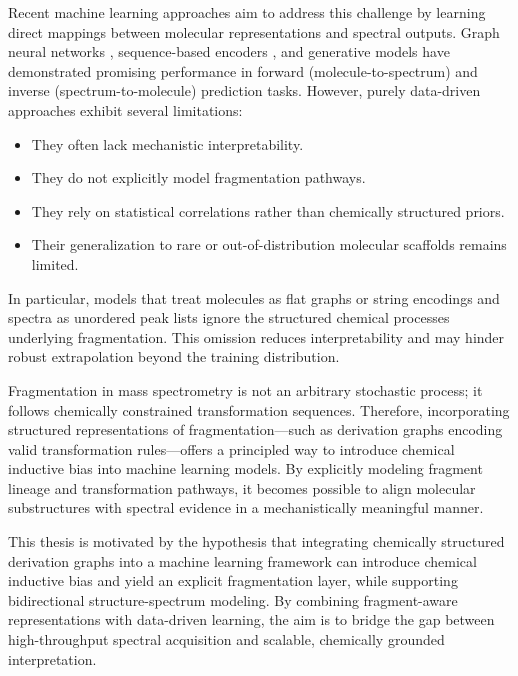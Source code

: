 Recent machine learning approaches aim to address this challenge by learning direct mappings between molecular representations and spectral outputs. 
Graph neural networks \cite{Young2024}, sequence-based encoders \cite[p.~1573]{Schwaller2019}, and generative models have demonstrated promising performance in forward (molecule-to-spectrum) and inverse (spectrum-to-molecule) prediction tasks. 
However, purely data-driven approaches exhibit several limitations:
\begin{itemize}
    \item They often lack mechanistic interpretability. \cite[p.~3\&~6]{Nowatzky2025}
    \item They do not explicitly model fragmentation pathways. \cite[p.~3]{Nowatzky2025}
    \item They rely on statistical correlations rather than chemically structured priors. \cite[p.~966]{Goldman2023}
    \item Their generalization to rare or out-of-distribution molecular scaffolds remains limited. \cite[p.~12]{Russo2024}
\end{itemize}

In particular, models that treat molecules as flat graphs or string encodings and spectra as unordered peak lists ignore the structured chemical processes underlying fragmentation. 
This omission reduces interpretability and may hinder robust extrapolation beyond the training distribution.
\cite[p.~3420]{Goldman2024}

Fragmentation in mass spectrometry is not an arbitrary stochastic process; 
it follows chemically constrained transformation sequences. \cite[ch.~4\&~8]{McLafferty1993}
Therefore, incorporating structured representations of fragmentation—such as derivation graphs encoding 
valid transformation rules—offers a principled way to introduce chemical inductive bias into machine learning models. 
By explicitly modeling fragment lineage and transformation pathways, 
it becomes possible to align molecular substructures with spectral evidence in a mechanistically meaningful manner.


This thesis is motivated by the hypothesis that integrating chemically structured derivation graphs into a machine learning framework can introduce chemical inductive bias and yield an explicit fragmentation layer, while supporting bidirectional structure-spectrum modeling. By combining fragment-aware representations with data-driven learning, the aim is to bridge the gap between high-throughput spectral acquisition and scalable, chemically grounded interpretation.

